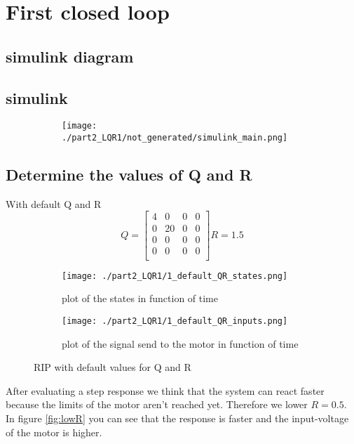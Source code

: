 \section{First closed loop}
\subsection{simulink diagram}

\subsection{simulink}
\begin{figure}[H]
	\centering
	\begin{subfigure}[b]{0.45\textwidth}
		\texttt{[image: ./part2\_LQR1/not\_generated/simulink\_main.png]}
	\end{subfigure}
	\caption{}
	\label{fig:main simulink part3 LQR}
\end{figure}

\subsection{Determine the values of Q and R}
With default Q and R
$$
Q=\begin{bmatrix}
4 & 0 & 0 & 0 \\
0 & 20 & 0 & 0 \\
0 & 0 & 0 & 0 \\
0 & 0 & 0 & 0 \\
\end{bmatrix}
R=1.5
$$
\begin{figure}[H]
	\centering
	\begin{subfigure}[b]{0.45\textwidth}
		\texttt{[image: ./part2\_LQR1/1\_default\_QR\_states.png]}
		\caption{plot of the states in function of time}
	\end{subfigure}
	\begin{subfigure}[b]{0.45\textwidth}
		\texttt{[image: ./part2\_LQR1/1\_default\_QR\_inputs.png]}
		\caption{plot of the signal send to the motor in function of time}
	\end{subfigure}
	\caption{RIP with default values for Q and R}
	\label{fig:default}
\end{figure}

After evaluating a step response we think that the system can react faster because the limits of the motor aren't reached yet. Therefore we lower $ R = 0.5$. In figure \ref{fig:lowR} you can see that the response is faster and the input-voltage of the motor is higher.

